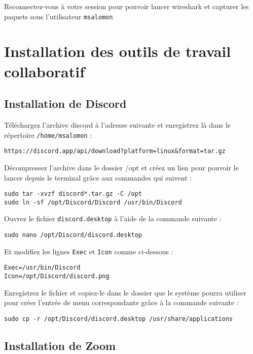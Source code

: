 Reconnectez-vous à votre session pour pouvoir lancer wireshark et capturer les paquets sous l'utilisateur \texttt{msalomon}

\section{Installation des outils de travail collaboratif}

\subsection{Installation de Discord}

Téléchargez l'archive discord à l'adresse suivante et enregistrez là dans le répertoire \texttt{/home/msalomon} :

\begin{lstlisting}
https://discord.app/api/download?platform=linux&format=tar.gz
\end{lstlisting}

Décompressez l'archive dans le dossier /opt et créez un lien pour pouvoir le lancer depuis le terminal grâce aux commandes qui suivent :

\begin{lstlisting}
sudo tar -xvzf discord*.tar.gz -C /opt
sudo ln -sf /opt/Discord/Discord /usr/bin/Discord
\end{lstlisting}

Ouvrez le fichier \texttt{discord.desktop} à l'aide de la commande suivante :

\begin{lstlisting}
sudo nano /opt/Discord/discord.desktop
\end{lstlisting}

Et modifiez les lignes \texttt{Exec} et \texttt{Icon} comme ci-dessous :

\begin{lstlisting}[style=tf]
Exec=/usr/bin/Discord
Icon=/opt/Discord/discord.png
\end{lstlisting}

Enregistrez le fichier et copiez-le dans le dossier que le système pourra utiliser pour créer l'entrée de menu correspondante grâce à la commande suivante :

\begin{lstlisting}
sudo cp -r /opt/Discord/discord.desktop /usr/share/applications
\end{lstlisting}

\subsection{Installation de Zoom}

